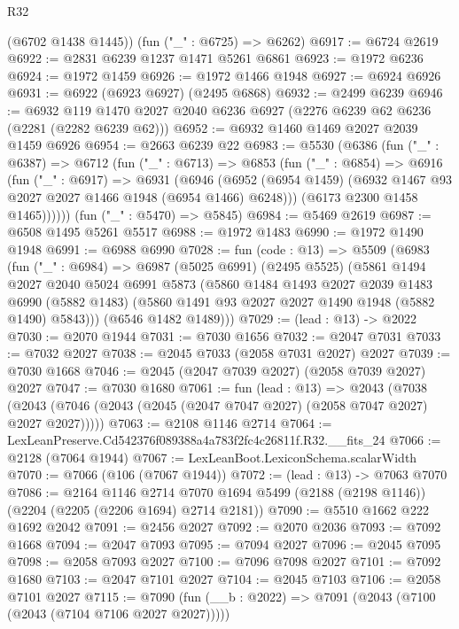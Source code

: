 \begin{lexlean}{R32}
\begin{coremodule}
      (@6702 @1438 @1445))
    (fun ("_" : @6725) => @6262)
@6917 := @6724 @2619
@6922 := @2831 @6239 @1237 @1471 @5261 @6861
@6923 := @1972 @6236
@6924 := @1972 @1459
@6926 := @1972 @1466 @1948
@6927 := @6924 @6926
@6931 := @6922 (@6923 @6927) (@2495 @6868)
@6932 := @2499 @6239
@6946 := @6932 @119 @1470 @2027 @2040 @6236 @6927 (@2276 @6239 @62 @6236 (@2281 (@2282 @6239 @62)))
@6952 := @6932 @1460 @1469 @2027 @2039 @1459 @6926
@6954 := @2663 @6239 @22
@6983 := @5530
    (@6386
      (fun ("_" : @6387) =>
      @6712
        (fun ("_" : @6713) =>
        @6853
          (fun ("_" : @6854) =>
          @6916
            (fun ("_" : @6917) =>
            @6931
              (@6946
                (@6952 (@6954 @1459) (@6932 @1467 @93 @2027 @2027 @1466 @1948 (@6954 @1466) @6248)))
              (@6173 @2300 @1458 @1465))))))
    (fun ("_" : @5470) => @5845)
@6984 := @5469 @2619
@6987 := @6508 @1495 @5261 @5517
@6988 := @1972 @1483
@6990 := @1972 @1490 @1948
@6991 := @6988 @6990
@7028 := fun (code : @13) =>
  @5509
    (@6983
      (fun ("_" : @6984) =>
      @6987
        (@5025 @6991)
        (@2495 @5525)
        (@5861
          @1494
          @2027
          @2040
          @5024
          @6991
          @5873
          (@5860
            @1484
            @1493
            @2027
            @2039
            @1483
            @6990
            (@5882 @1483)
            (@5860 @1491 @93 @2027 @2027 @1490 @1948 (@5882 @1490) @5843)))
        (@6546 @1482 @1489)))
@7029 := (lead : @13) -> @2022
@7030 := @2070 @1944
@7031 := @7030 @1656
@7032 := @2047 @7031
@7033 := @7032 @2027
@7038 := @2045 @7033 (@2058 @7031 @2027) @2027
@7039 := @7030 @1668
@7046 := @2045 (@2047 @7039 @2027) (@2058 @7039 @2027) @2027
@7047 := @7030 @1680
@7061 := fun (lead : @13) =>
  @2043 (@7038 (@2043 (@7046 (@2043 (@2045 (@2047 @7047 @2027) (@2058 @7047 @2027) @2027 @2027)))))
@7063 := @2108 @1146 @2714
@7064 := LexLeanPreserve.Cd542376f089388a4a783f2fc4c26811f.R32.__fits_24
@7066 := @2128 (@7064 @1944)
@7067 := LexLeanBoot.LexiconSchema.scalarWidth
@7070 := @7066 (@106 (@7067 @1944))
@7072 := (lead : @13) -> @7063 @7070
@7086 := @2164
    @1146
    @2714
    @7070
    @1694
    @5499
    (@2188 (@2198 @1146))
    (@2204 (@2205 (@2206 @1694) @2714 @2181))
@7090 := @5510 @1662 @222 @1692 @2042
@7091 := @2456 @2027
@7092 := @2070 @2036
@7093 := @7092 @1668
@7094 := @2047 @7093
@7095 := @7094 @2027
@7096 := @2045 @7095
@7098 := @2058 @7093 @2027
@7100 := @7096 @7098 @2027
@7101 := @7092 @1680
@7103 := @2047 @7101 @2027
@7104 := @2045 @7103
@7106 := @2058 @7101 @2027
@7115 := @7090 (fun (__b : @2022) => @7091 (@2043 (@7100 (@2043 (@7104 @7106 @2027 @2027)))))

\end{coremodule}
\end{lexlean}
